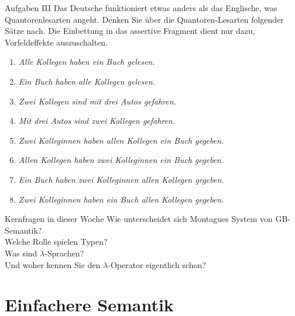 \begin{frame}
  {Aufgaben III}
  Das Deutsche funktioniert etwas anders als das Englische, was Quantorenlesarten angeht. Denken Sie über die Quantoren-Lesarten folgender Sätze nach. Die Einbettung in das assertive Fragment dient nur dazu, Vorfeldeffekte auszuschalten.
  \Halbzeile
  \begin{enumerate}[<+->]
    \item \textit{Alle Kollegen haben ein Buch gelesen.}
    \item \textit{Ein Buch haben alle Kollegen gelesen.}
    \item \textit{Zwei Kollegen sind mit drei Autos gefahren.}
    \item \textit{Mit drei Autos sind zwei Kollegen gefahren.}
    \item \textit{Zwei Kolleginnen haben allen Kollegen ein Buch gegeben.}
    \item \textit{Allen Kollegen haben zwei Kolleginnen ein Buch gegeben.}
    \item \textit{Ein Buch haben zwei Kolleginnen allen Kollegen gegeben.}
    \item \textit{Zwei Kolleginnen haben ein Buch allen Kollegen gegeben.}
  \end{enumerate}
\end{frame}





\begin{frame}
  {Kernfragen in dieser Woche}
  \onslide<+->
  \onslide<+->
  \Large
  \centering
  Wie unterscheidet sich Montagues System von GB-Semantik?\\
  \onslide<+->
  \Halbzeile
  Welche Rolle spielen \alert{Typen}?\\
  \onslide<+->
  \Halbzeile
  Was sind \alert{$\lambda$-Sprachen?}\\
  Und woher kennen Sie den $\lambda$-Operator eigentlich schon?\\
  \onslide<+->
  \Halbzeile
\end{frame}

\section{Einfachere Semantik}

